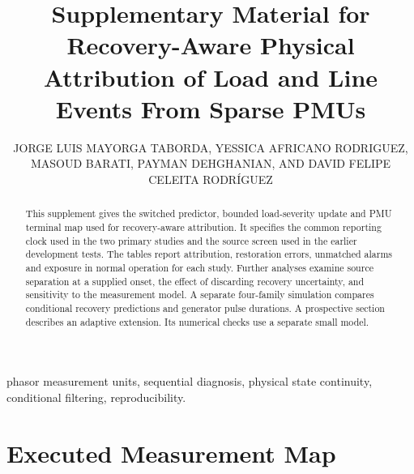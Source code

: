 \documentclass{ieeeaccess}
\begin{document}
\history{}
\doi{}
\title{Supplementary Material for Recovery-Aware Physical Attribution of Load and Line Events From Sparse PMUs}
\author{\uppercase{Jorge Luis Mayorga Taborda}, \uppercase{Yessica Africano Rodriguez}, \uppercase{Masoud Barati}, \uppercase{Payman Dehghanian}, AND \uppercase{David Felipe Celeita Rodr\'iguez}}
\address[1]{Universidad de los Andes, Bogot\'a, Colombia}
\address[2]{Department of Electrical and Computer Engineering, University of Pittsburgh, Pittsburgh, PA, USA}
\address[3]{Department of Electrical and Computer Engineering, The George Washington University, Washington, DC, USA}
\address[4]{Faculty of Engineering, Universidad de La Sabana, Ch\'ia, Colombia}

\begin{abstract}
This supplement gives the switched predictor, bounded load-severity
update and PMU terminal map used for recovery-aware attribution. It
specifies the common reporting clock used in the two primary studies and
the source screen used in the earlier development tests. The tables report
attribution, restoration errors, unmatched alarms and exposure in normal
operation for each study. Further analyses examine source separation at a
supplied onset, the effect of discarding recovery uncertainty, and
sensitivity to the measurement model. A separate four-family simulation
compares conditional recovery predictions and generator pulse durations.
A prospective section describes
an adaptive extension. Its numerical checks use a separate small model.
\end{abstract}
\begin{keywords}
phasor measurement units, sequential diagnosis, physical state continuity,
conditional filtering, reproducibility.
\end{keywords}
\titlepgskip=-21pt
\PSevenMakePreprintTitle
\raggedbottom
\appendices





\section{Executed Measurement Map}

\end{document}
